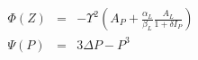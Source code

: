 \begin{eqnarray}
  \Phi(Z) &=& - \varUpsilon^{2} \left(A_{P} + \frac{\alpha_{L}}{\beta_{L}}\frac{A_{L}}{1+ \delta I_{P}}\right)\\
  \Psi(P) &=&  3 \Delta P - P^{3}
\end{eqnarray}
